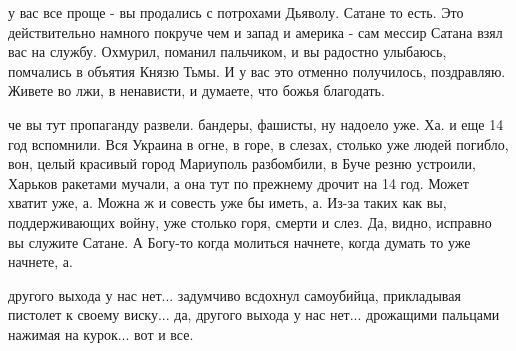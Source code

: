 у вас все проще - вы продались с потрохами Дьяволу. Сатане то есть. Это
действительно намного покруче чем и запад и америка - сам мессир Сатана взял
вас на службу. Охмурил, поманил пальчиком, и вы радостно улыбаюсь, помчались в
объятия Князю Тьмы. И у вас это отменно получилось, поздравляю. Живете во лжи,
в ненависти, и думаете, что божья благодать.

че вы тут пропаганду развели. бандеры, фашисты, ну надоело уже.  Ха. и еще 14
год вспомнили. Вся Украина в огне, в горе, в слезах, столько уже людей погибло,
вон, целый красивый город Мариуполь разбомбили, в Буче резню устроили, Харьков
ракетами мучали, а она тут по прежнему дрочит на 14 год. Может хватит уже, а.
Можна ж и совесть уже бы иметь, а. Из-за таких как вы, поддерживающих войну,
уже столько горя, смерти и слез. Да, видно, исправно вы служите Сатане. А
Богу-то когда молиться начнете, когда думать то уже начнете, а.

другого выхода у нас нет... задумчиво всдохнул самоубийца, прикладывая пистолет
к своему виску... да, другого выхода у нас нет... дрожащими пальцами нажимая на
курок... вот и все.
